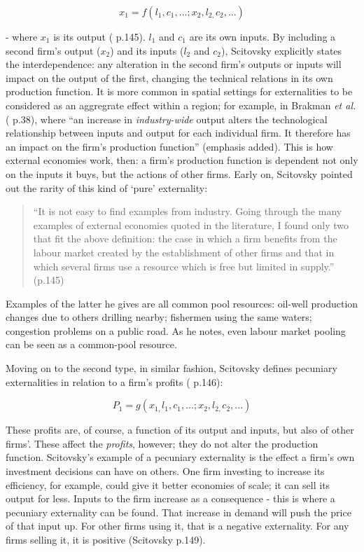 {\begin{equation}
x_{1}=f(l_{1},c_{1},...;x_{2},l_{2,}c_{2},...)\label{eq:scit1}
\end{equation}

 - where $x_{1}$ is its output (\citealt{scitovsky_two_1954} p.145). $l_{1}$ and $c_{1}$ are its own inputs. By including a second firm's output ($x_{2}$) and its inputs ($l_{2}$ and $c_{2}$), Scitovsky explicitly states the interdependence: any alteration in the second firm's outputs or inputs will impact on the output of the first, changing the technical relations in its own production function. It is more common in spatial settings for externalities to be considered as an aggregrate effect within a region; for example, in Brakman \emph{et al.} (\citeyear{brakman_new_2009} p.38), where ``an increase in \emph{industry-wide} output alters the technological relationship between inputs and output for each individual firm. It therefore has an impact on the firm's production function'' (emphasis added). This is how external economies work, then: a firm's production function is dependent not only on the inputs it buys, but the actions of other firms. Early on, Scitovsky pointed out the rarity of this kind of `pure' externality: 

\begin{quote}
``It is not easy to find examples from industry. Going through the many examples of external economies quoted in the literature, I found only two that fit the above definition: the case in which a firm benefits from the labour market created by the establishment of other firms and that in which several firms use a resource which is free but limited in supply.'' (p.145) 
\end{quote}

Examples of the latter he gives are all common pool resources: oil-well production changes due to others drilling nearby; fishermen using the same waters; congestion problems on a public road. As he notes, even labour market pooling can be seen as a common-pool resource.

Moving on to the second type, in similar fashion, Scitovsky defines pecuniary externalities in relation to a firm's profits (\citealt{scitovsky_two_1954} p.146):

\begin{equation}
P_{1}=g(x_{1,}l_{1},c_{1},...;x_{2},l_{2,}c_{2},...)\label{eq:scit2}
\end{equation}

These profits are, of course, a function of its output and inputs, but also of other firms'. These affect the \emph{profits}, however; they do not alter the production function. Scitovsky's example of a pecuniary externality is the effect a firm's own investment decisions can have on others. One firm investing to increase its efficiency, for example, could give it better economies of scale; it can sell its output for less. Inputs to the firm increase as a consequence - this is where a pecuniary externality can be found. That increase in demand will push the price of that input up. For other firms using it, that is a negative externality. For any firms selling it, it is positive (Scitovsky p.149).

}
